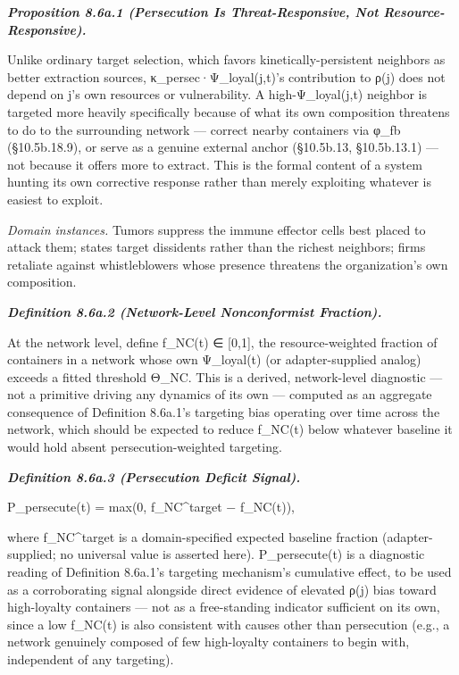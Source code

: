 \documentclass[
]{article}
\begin{document}
\emph{\textbf{Proposition 8.6a.1 (Persecution Is Threat-Responsive, Not
Resource-Responsive).}}

Unlike ordinary target selection, which favors kinetically-persistent
neighbors as better extraction sources, κ\_persec·Ψ\_loyal(j,t)'s
contribution to ρ(j) does not depend on j's own resources or
vulnerability. A high-Ψ\_loyal(j,t) neighbor is targeted more heavily
specifically because of what its own composition threatens to do to the
surrounding network --- correct nearby containers via φ\_fb
(§10.5b.18.9), or serve as a genuine external anchor (§10.5b.13,
§10.5b.13.1) --- not because it offers more to extract. This is the
formal content of a system hunting its own corrective response rather
than merely exploiting whatever is easiest to exploit.

\emph{Domain instances.} Tumors suppress the immune effector cells best
placed to attack them; states target dissidents rather than the richest
neighbors; firms retaliate against whistleblowers whose presence
threatens the organization's own composition.

\emph{\textbf{Definition 8.6a.2 (Network-Level Nonconformist
Fraction).}}

At the network level, define f\_NC(t) ∈ {[}0,1{]}, the resource-weighted
fraction of containers in a network whose own Ψ\_loyal(t) (or
adapter-supplied analog) exceeds a fitted threshold Θ\_NC. This is a
derived, network-level diagnostic --- not a primitive driving any
dynamics of its own --- computed as an aggregate consequence of
Definition 8.6a.1's targeting bias operating over time across the
network, which should be expected to reduce f\_NC(t) below whatever
baseline it would hold absent persecution-weighted targeting.

\emph{\textbf{Definition 8.6a.3 (Persecution Deficit Signal).}}

P\_persecute(t) = max(0, f\_NC\^{}target − f\_NC(t)),

where f\_NC\^{}target is a domain-specified expected baseline fraction
(adapter-supplied; no universal value is asserted here). P\_persecute(t)
is a diagnostic reading of Definition 8.6a.1's targeting mechanism's
cumulative effect, to be used as a corroborating signal alongside direct
evidence of elevated ρ(j) bias toward high-loyalty containers --- not as
a free-standing indicator sufficient on its own, since a low f\_NC(t) is
also consistent with causes other than persecution (e.g., a network
genuinely composed of few high-loyalty containers to begin with,
independent of any targeting).
\end{document}
